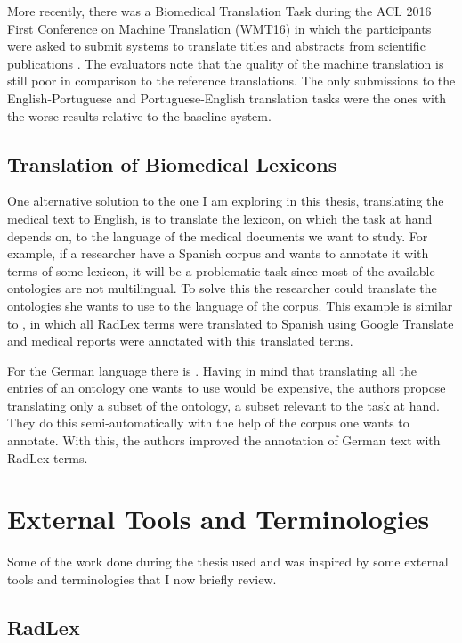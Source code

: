 More recently, there was a Biomedical Translation Task during the ACL 2016 First Conference on Machine Translation (WMT16) in which the participants were asked to submit systems to translate titles and abstracts from scientific publications \citep{Bojar2016}. The evaluators note that the quality of the machine translation is still poor in comparison to the reference translations. The only submissions to the English-Portuguese and Portuguese-English translation tasks \citep{Aires2016} were the ones with the worse results relative to the baseline system.

\subsection{Translation of Biomedical Lexicons}

One alternative solution to the one I am exploring in this thesis, translating the medical text to English, is to translate the lexicon, on which the task at hand depends on, to the language of the medical documents we want to study. For example, if a researcher have a Spanish corpus and wants to annotate it with terms of some lexicon, it will be a problematic task since most of the available ontologies are not multilingual. To solve this the researcher could translate the ontologies she wants to use to the language of the corpus. This example is similar to \citep{Cotik2015}, in which all RadLex terms were translated to Spanish using Google Translate and medical reports were annotated with this translated terms. 

For the German language there is \citep{Bretschneider}. Having in mind that translating all the entries of an ontology one wants to use would be expensive, the authors propose translating only a subset of the ontology, a subset relevant to the task at hand. They do this semi-automatically with the help of the corpus one wants to annotate. With this, the authors improved the annotation of German text with RadLex terms.

\section{External Tools and Terminologies}

Some of the work done during the thesis used and was inspired by some external tools and terminologies that I now briefly review.

\subsection{RadLex}
\label{Radlex}

